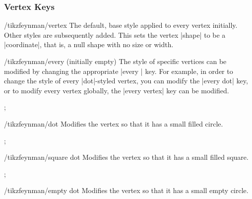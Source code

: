 \documentclass[a4paper,final]{ltxdoc}
\begin{document}
\begin{codeexample}[execute code=false]
\subsubsection{Vertex Keys}
\label{subsubsec:vertex_keys}

\begin{key}{/tikzfeynman/vertex}
  The default, base style applied to every vertex initially.  Other styles
  are subsequently added.  This sets the vertex |shape| to be a |coordinate|,
  that is, a null shape with no size or width.
\end{key}

\begin{stylekey}{/tikzfeynman/every  (initially \normalfont empty)}
  The style of specific vertices can be modified by changing the appropriate
  |every | key.  For example, in order to change the style of
  every |dot|-styled vertex, you can modify the |every dot| key, or to modify
  every vertex globally, the |every vertex| key can be modified.

\begin{codeexample}[]
;
\end{codeexample}
\end{stylekey}

\begin{key}{/tikzfeynman/dot}
  Modifies the vertex so that it has a small filled circle.

\begin{codeexample}[]
;
\end{codeexample}
\end{key}

\begin{key}{/tikzfeynman/square dot}
  Modifies the vertex so that it has a small filled square.

\begin{codeexample}[]
;
\end{codeexample}
\end{key}

\begin{key}{/tikzfeynman/empty dot}
  Modifies the vertex so that it has a small empty circle.


\end{key}
\end{codeexample}
\end{document}
